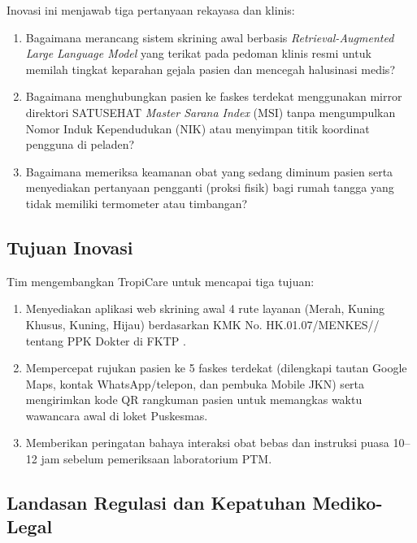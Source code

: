 Inovasi ini menjawab tiga pertanyaan rekayasa dan klinis:
\begin{enumerate}
    \item Bagaimana merancang sistem skrining awal berbasis \textit{Retrieval-Augmented Large Language Model} yang terikat pada pedoman klinis resmi untuk memilah tingkat keparahan gejala pasien dan mencegah halusinasi medis?
    \item Bagaimana menghubungkan pasien ke faskes terdekat menggunakan mirror direktori SATUSEHAT \textit{Master Sarana Index} (MSI) tanpa mengumpulkan Nomor Induk Kependudukan (NIK) atau menyimpan titik koordinat pengguna di peladen?
    \item Bagaimana memeriksa keamanan obat yang sedang diminum pasien serta menyediakan pertanyaan pengganti (proksi fisik) bagi rumah tangga yang tidak memiliki termometer atau timbangan?
\end{enumerate}

\subsection{Tujuan Inovasi}

Tim mengembangkan TropiCare untuk mencapai tiga tujuan:
\begin{enumerate}
    \item Menyediakan aplikasi web skrining awal 4 rute layanan (Merah, Kuning Khusus, Kuning, Hijau) berdasarkan KMK No. HK.01.07/\allowbreak MENKES// tentang PPK Dokter di FKTP \citep{Kemenkes2022a}.
    \item Mempercepat rujukan pasien ke 5 faskes terdekat (dilengkapi tautan Google Maps, kontak WhatsApp/telepon, dan pembuka Mobile JKN) serta mengirimkan kode QR rangkuman pasien untuk memangkas waktu wawancara awal di loket Puskesmas.
    \item Memberikan peringatan bahaya interaksi obat bebas dan instruksi puasa 10--12 jam sebelum pemeriksaan laboratorium PTM.
\end{enumerate}

\subsection{Landasan Regulasi dan Kepatuhan Mediko-Legal}

